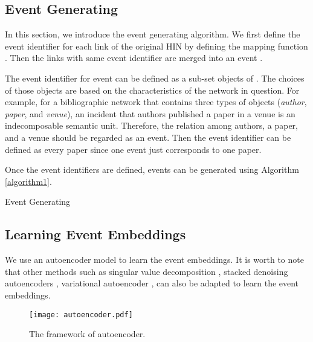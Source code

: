 \subsection{Event Generating}
In this section, we introduce the event generating algorithm. We first define the event identifier  for each link  of the original HIN by defining the mapping function . Then the links with same event identifier are merged into an event .

The event identifier  for event  can be defined as a sub-set objects of . The choices of those objects are based on the characteristics of the network in question. For example, for a bibliographic network that contains three types of objects ({\itshape author}, {\itshape paper}, and {\itshape venue}), an incident that authors published a paper in a venue is an indecomposable semantic unit. Therefore, the relation among authors, a paper, and a venue should be regarded as an event. Then the event identifier can be defined as every paper since one event just corresponds to one paper.

Once the event identifiers are defined, events can be generated using Algorithm \ref{algorithm1}.

\begin{algorithm}
	\DontPrintSemicolon
	\caption{Event Generating}\label{algorithm1}
\end{algorithm}


\subsection{Learning Event Embeddings}
We use an autoencoder model to learn the event embeddings. It is worth to note that other methods such as singular value decomposition \cite{golub1970singular}, stacked denoising autoencoders \cite{vincent2010stacked}, variational autoencoder \cite{doersch2016tutorial}, can also be adapted to learn the event embeddings. 

\begin{figure}
	\centering
	\texttt{[image: autoencoder.pdf]}
	\caption{{\small The framework of autoencoder.}}\label{figure5}
\end{figure}

